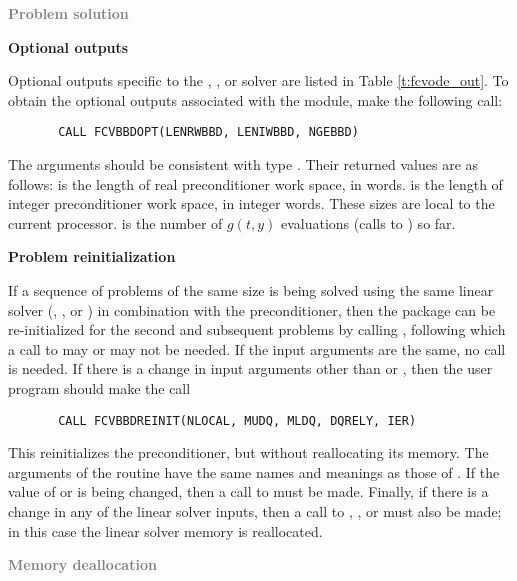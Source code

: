 \begin{Steps}
\item \textcolor{gray}{\bf Problem solution}
  
\item {\bf {\cvbbdpre} Optional outputs}
  
  Optional outputs specific to the {\spgmr}, {\spbcg}, or {\sptfqmr} solver are 
  listed in Table \ref{t:fcvode_out}.
  To obtain the optional outputs associated with the {\cvbbdpre} module, make
  the following call:
\begin{verbatim}
       CALL FCVBBDOPT(LENRWBBD, LENIWBBD, NGEBBD)
\end{verbatim}
  The arguments should be consistent with {\CC} type .  Their
  returned values are as follows:
   is the length of real preconditioner work space, in 
  words.  is the length of integer preconditioner work space, in
  integer words.  These sizes are local to the current processor.
   is the number of $g(t,y)$ evaluations (calls to ) so far.
  
\item {\bf Problem reinitialization}
  
  If a sequence of problems of the same size is being solved using the same
  linear solver ({\spgmr}, {\spbcg}, or {\sptfqmr})  in combination with the
  {\cvbbdpre} preconditioner, then the {\cvode} package can be re-initialized
  for the second and subsequent problems by calling ,
  following which a call to  may or may not be needed.
  If the input arguments are the same, no  call is needed.
  If there is a change in input arguments other than  or ,
  then the user program should make the call 
\begin{verbatim}
       CALL FCVBBDREINIT(NLOCAL, MUDQ, MLDQ, DQRELY, IER)
\end{verbatim}
  This reinitializes the {\cvbbdpre} preconditioner, but without
  reallocating its memory.  The arguments of the 
  routine have the same names and meanings as those of .
  If the value of  or  is being changed, then a call to
   must be made.  Finally, if there is a change in any of the
  linear solver inputs, then a call to , , or
   must also be made; in this case the linear solver memory is
  reallocated.
  
\item \textcolor{gray}{\bf Memory deallocation}


\end{Steps}
